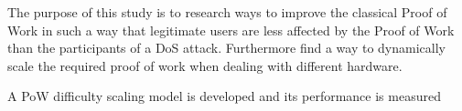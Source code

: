 The purpose of this study is to research ways to improve the classical Proof of Work in such a way that legitimate users are less affected by the Proof of Work than the participants of a DoS attack. Furthermore find a way to dynamically scale the required proof of work when dealing with different hardware.

A PoW difficulty scaling model is developed and its performance is measured